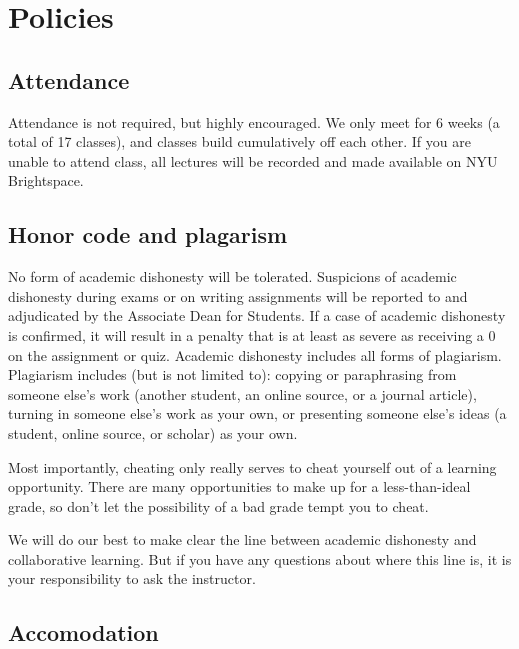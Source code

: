 \documentclass[
]{book}
\begin{document}
\hypertarget{policies}{%
\section{Policies}\label{policies}}

\hypertarget{attendance}{%
\subsection{Attendance}\label{attendance}}

Attendance is not required, but highly encouraged. We only meet for 6 weeks (a total of 17 classes), and classes build cumulatively off each other. If you are unable to attend class, all lectures will be recorded and made available on NYU Brightspace.

\hypertarget{honor-code-and-plagarism}{%
\subsection{Honor code and plagarism}\label{honor-code-and-plagarism}}

No form of academic dishonesty will be tolerated. Suspicions of academic dishonesty during exams or on writing assignments will be reported to and adjudicated by the Associate Dean for Students. If a case of academic dishonesty is confirmed, it will result in a penalty that is at least as severe as receiving a 0 on the assignment or quiz. Academic dishonesty includes all forms of plagiarism. Plagiarism includes (but is not limited to): copying or paraphrasing from someone else's work (another student, an online source, or a journal article), turning in someone else's work as your own, or presenting someone else's ideas (a student, online source, or scholar) as your own.

Most importantly, cheating only really serves to cheat yourself out of a learning opportunity. There are many opportunities to make up for a less-than-ideal grade, so don't let the possibility of a bad grade tempt you to cheat.

We will do our best to make clear the line between academic dishonesty and collaborative learning. But if you have any questions about where this line is, it is your responsibility to ask the instructor.

\hypertarget{accomodation}{%
\subsection{Accomodation}\label{accomodation}}
\end{document}
